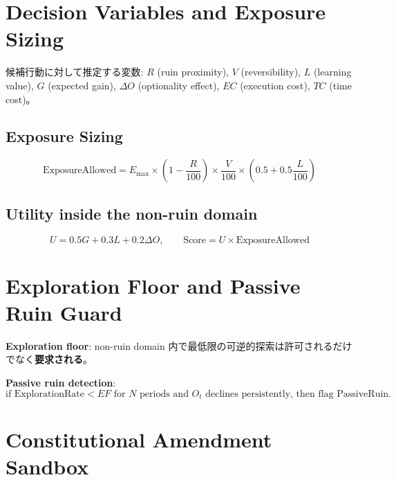\documentclass[11pt,a4paper]{article}
\theoremstyle{definition}\newtheorem{definition}{Definition}[section]
\begin{document}
\section{Decision Variables and Exposure Sizing}

候補行動に対して推定する変数: $R$ (ruin proximity), $V$ (reversibility), $L$ (learning value), $G$ (expected gain), $\Delta O$ (optionality effect), $EC$ (execution cost), $TC$ (time cost)。

\subsection{Exposure Sizing}
\begin{equation}
\text{ExposureAllowed} = E_{\max} \times \left(1 - \frac{R}{100}\right) \times \frac{V}{100} \times \left(0.5 + 0.5\frac{L}{100}\right)
\end{equation}

\subsection{Utility inside the non-ruin domain}
\begin{equation}
U = 0.5G + 0.3L + 0.2\Delta O, \qquad \text{Score} = U \times \text{ExposureAllowed}
\end{equation}


\section{Exploration Floor and Passive Ruin Guard}

\textbf{Exploration floor}: non-ruin domain 内で最低限の可逆的探索は許可されるだけでなく\textbf{要求される}。

\textbf{Passive ruin detection}:
\begin{equation}
\text{if ExplorationRate} < EF \text{ for } N \text{ periods and } O_t \text{ declines persistently, then flag PassiveRuin.}
\end{equation}


\section{Constitutional Amendment Sandbox}
\end{document}
